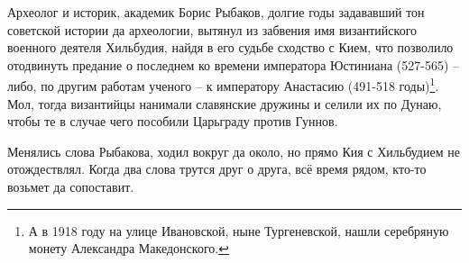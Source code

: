 Археолог и историк, академик Борис Рыбаков, долгие годы задававший тон советской истории да археологии, вытянул из забвения имя византийского военного деятеля Хильбудия, найдя в его судьбе сходство с Кием, что позволило отодвинуть предание о последнем ко времени императора Юстиниана (527-565) – либо, по другим работам ученого – к императору Анастасию (491-518 годы)\footnote{А в 1918 году на улице Ивановской, ныне Тургеневской, нашли серебряную монету Александра Македонского.}. Мол, тогда византийцы нанимали славянские дружины и селили их по Дунаю, чтобы те в случае чего пособили Царьграду против Гуннов.

Менялись слова Рыбакова, ходил вокруг да около, но прямо Кия с Хильбудием не отождествлял. Когда два слова трутся друг о друга, всё время рядом, кто-то возьмет да сопоставит.

